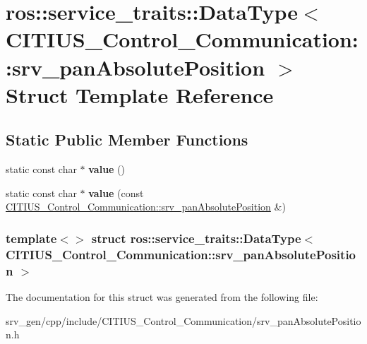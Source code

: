 \hypertarget{structros_1_1service__traits_1_1_data_type_3_01_c_i_t_i_u_s___control___communication_1_1srv__pan_absolute_position_01_4}{\section{ros\-:\-:service\-\_\-traits\-:\-:\-Data\-Type$<$ \-C\-I\-T\-I\-U\-S\-\_\-\-Control\-\_\-\-Communication\-:\-:srv\-\_\-pan\-Absolute\-Position $>$ \-Struct \-Template \-Reference}
\label{structros_1_1service__traits_1_1_data_type_3_01_c_i_t_i_u_s___control___communication_1_1srv__pan_absolute_position_01_4}
}
\subsection*{\-Static \-Public \-Member \-Functions}
\begin{DoxyCompactItemize}
\item 
\hypertarget{structros_1_1service__traits_1_1_data_type_3_01_c_i_t_i_u_s___control___communication_1_1srv__pan_absolute_position_01_4_a4d7a2f8cf3bcb0d1ec464d667a27667d}{static const char $\ast$ {\bfseries value} ()}\label{structros_1_1service__traits_1_1_data_type_3_01_c_i_t_i_u_s___control___communication_1_1srv__pan_absolute_position_01_4_a4d7a2f8cf3bcb0d1ec464d667a27667d}

\item 
\hypertarget{structros_1_1service__traits_1_1_data_type_3_01_c_i_t_i_u_s___control___communication_1_1srv__pan_absolute_position_01_4_aa7b850a534919736a9383ed6bc98840e}{static const char $\ast$ {\bfseries value} (const \hyperlink{struct_c_i_t_i_u_s___control___communication_1_1srv__pan_absolute_position}{\-C\-I\-T\-I\-U\-S\-\_\-\-Control\-\_\-\-Communication\-::srv\-\_\-pan\-Absolute\-Position} \&)}\label{structros_1_1service__traits_1_1_data_type_3_01_c_i_t_i_u_s___control___communication_1_1srv__pan_absolute_position_01_4_aa7b850a534919736a9383ed6bc98840e}

\end{DoxyCompactItemize}
\subsubsection*{template$<$$>$ struct ros\-::service\-\_\-traits\-::\-Data\-Type$<$ C\-I\-T\-I\-U\-S\-\_\-\-Control\-\_\-\-Communication\-::srv\-\_\-pan\-Absolute\-Position $>$}



\-The documentation for this struct was generated from the following file\-:\begin{DoxyCompactItemize}
\item 
srv\-\_\-gen/cpp/include/\-C\-I\-T\-I\-U\-S\-\_\-\-Control\-\_\-\-Communication/srv\-\_\-pan\-Absolute\-Position.\-h\end{DoxyCompactItemize}
